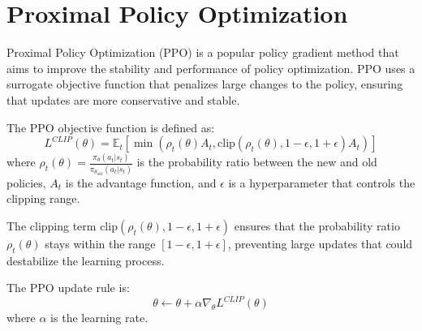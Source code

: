 \documentclass[12pt]{article}
\begin{document}
\section{Proximal Policy Optimization}

Proximal Policy Optimization (PPO) is a popular policy gradient method that aims to improve the stability and performance of policy optimization. PPO uses a surrogate objective function that penalizes large changes to the policy, ensuring that updates are more conservative and stable.

The PPO objective function is defined as:
\[ 
L^{CLIP}(\theta) = \mathbb{E}_{t} \left[ \min \left( \rho_t(\theta) A_t, \text{clip}(\rho_t(\theta), 1 - \epsilon, 1 + \epsilon) A_t \right) \right] 
\]
where \( \rho_t(\theta) = \frac{\pi_\theta(a_t | s_t)}{\pi_{\theta_{\text{old}}}(a_t | s_t)} \) is the probability ratio between the new and old policies, \( A_t \) is the advantage function, and \( \epsilon \) is a hyperparameter that controls the clipping range.

The clipping term \( \text{clip}(\rho_t(\theta), 1 - \epsilon, 1 + \epsilon) \) ensures that the probability ratio \( \rho_t(\theta) \) stays within the range \([1 - \epsilon, 1 + \epsilon]\), preventing large updates that could destabilize the learning process.

The PPO update rule is:
\[ 
\theta \leftarrow \theta + \alpha \nabla_\theta L^{CLIP}(\theta) 
\]
where \( \alpha \) is the learning rate.
\end{document}
